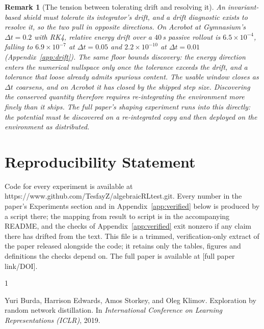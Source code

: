 \documentclass{article}
\newtheorem{remark}{Remark}
\begin{document}
\begin{remark}[The tension between tolerating drift and resolving it]
\label{rem:tension}
An invariant-based shield must tolerate its integrator's drift, and a
drift diagnostic exists to resolve it, so the two pull in opposite directions.
On Acrobot at Gymnasium's $\Delta t = 0.2$ with RK4, relative energy drift over
a $40\,$s passive rollout is $6.5\times10^{-4}$, falling to $6.9\times10^{-7}$
at $\Delta t = 0.05$ and $2.2\times10^{-10}$ at $\Delta t = 0.01$
(Appendix~\ref{app:drift}). The same floor bounds \emph{discovery}: the energy
direction enters the numerical nullspace only once
the tolerance exceeds the drift, and a tolerance that loose already admits
spurious content. The usable window closes as $\Delta t$ coarsens, and on
Acrobot it has closed by the shipped step size. Discovering the conserved
quantity therefore requires re-integrating the environment more finely than it
ships. The full paper's shaping experiment runs into this directly: the potential must be
discovered on a re-integrated copy and then deployed on the environment as
distributed.
\end{remark}

\section*{Reproducibility Statement}

Code for every experiment is available at https://www.github.com/TesfayZ/algebraicRLtest.git. Every number in the paper's Experiments section and in Appendix~\ref{app:verified} below is produced by a script there; the mapping from result to script is in the accompanying README, and the checks of Appendix~\ref{app:verified} exit nonzero if any claim there has drifted from the text. This file is a trimmed, verification-only extract of the paper released alongside the code; it retains only the tables, figures and definitions the checks depend on. The full paper is available at [full paper link/DOI].

\begin{thebibliography}{1}

Yuri Burda, Harrison Edwards, Amos Storkey, and Oleg Klimov.
\newblock Exploration by random network distillation.
\newblock In {\em International Conference on Learning Representations (ICLR)}, 2019.

\end{thebibliography}
\end{document}
